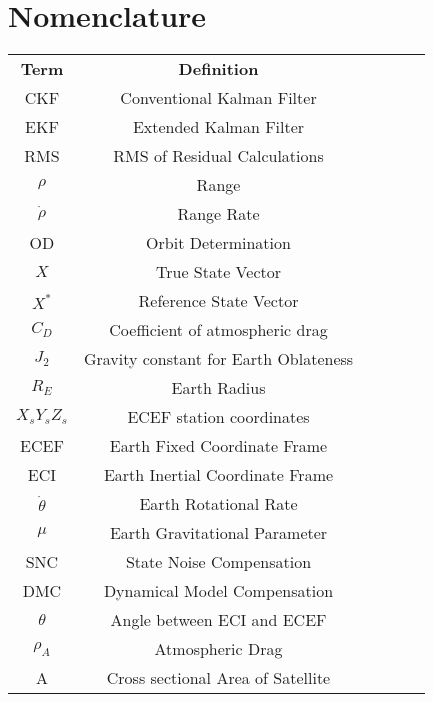 \documentclass[12pt,a4paper,oneside]{article}
\numberwithin{equation}{section}   		%
\begin{document}
\newpage
\section{Nomenclature}
	\begin{tabular*}{\textwidth}{c@{\extracolsep{\fill}}ccccc}
		\hline
		\textbf{Term}	&	\textbf{Definition}			\\
		CKF			&	Conventional Kalman Filter	\\
		EKF			&	Extended Kalman Filter		\\
		RMS			&	RMS of Residual Calculations	\\
		$\rho$		&	Range					\\
		$\dot{\rho}$	&	Range Rate				\\
		OD			&	Orbit Determination			\\
		$X$			&	True State Vector			\\
		$X^*$		&	Reference State Vector		\\
		$C_D$		&	Coefficient of atmospheric drag\\
		$J_2$		&	Gravity constant for Earth Oblateness 	\\
		$R_E$		&	Earth Radius				\\
		$X_s Y_s Z_s$ & 	ECEF station coordinates		\\
		ECEF		&	Earth Fixed Coordinate Frame	\\
		ECI			&	Earth Inertial Coordinate Frame\\
		$\dot{\theta}$	&	Earth Rotational Rate		\\
		$\mu$		&	Earth Gravitational Parameter 	\\
		SNC			&	State Noise Compensation	\\
		DMC		& 	Dynamical Model Compensation	\\
		$\theta$		&	Angle between ECI and ECEF	\\
		$\rho_A$		&	Atmospheric Drag			\\
		A			&	Cross sectional Area of Satellite\\
	\end{tabular*}




\newpage
\tableofcontents{}
\newpage
\listoffigures{}
\listoftables{}
\end{document}
